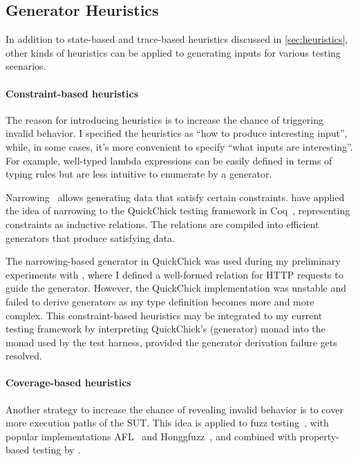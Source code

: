 \subsection{Generator Heuristics}
\label{sec:related-gen}

In addition to state-based and trace-based heuristics discussed in
\autoref{sec:heuristics}, other kinds of heuristics can be applied to generating
inputs for various testing scenarios.

\paragraph{Constraint-based heuristics}
The reason for introducing heuristics is to increase the chance of triggering
invalid behavior.  I specified the heuristics as ``how to produce interesting
input'', while, in some cases, it's more convenient to specify ``what inputs are
interesting''.  For example, well-typed lambda expressions can be easily defined
in terms of typing rules but are less intuitive to enumerate by a generator.

Narrowing~\cite{narrowing} allows generating data that satisfy certain
constraints.  \citet{gengood} have applied the idea of narrowing to the
QuickChick testing framework in Coq~\cite{quickchick}, representing constraints
as inductive relations.  The relations are compiled into efficient generators
that produce satisfying data.

The narrowing-based generator in QuickChick was used during my preliminary
experiments with \http, where I defined a well-formed relation for HTTP requests
to guide the generator.  However, the QuickChick implementation was unstable and
failed to derive generators as my type definition becomes more and more complex.
This constraint-based heuristics may be integrated to my current testing
framework by interpreting QuickChick's  (generator) monad into
the  monad used by the test harness, provided the generator derivation
failure gets resolved.

\paragraph{Coverage-based heuristics}
Another strategy to increase the chance of revealing invalid behavior is to
cover more execution paths of the SUT.  This idea is applied to fuzz
testing~\cite{fuzz}, with popular implementations AFL~\cite{afl} and
Honggfuzz~\cite{honggfuzz}, and combined with property-based testing by
\citet{fuzzchick}.


